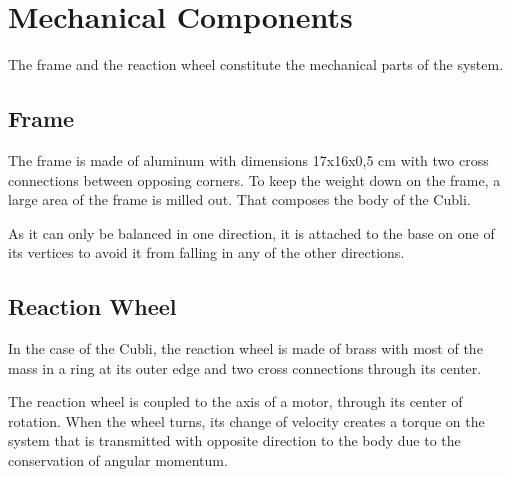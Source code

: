 \section{Mechanical Components}
The frame and the reaction wheel constitute the mechanical parts of the system.

\subsection{Frame}
The frame is made of aluminum with dimensions 17x16x0,5 \si{cm}  with two cross connections between opposing corners. To keep the weight down on the frame, a large area of the frame is milled out. That composes the body of the Cubli. 

As it can only be balanced in one direction, it is attached to the base on one of its vertices to avoid it from falling in any of the other directions.


\subsection{Reaction Wheel}
In the case of the Cubli, the reaction wheel is made of brass with most of the mass in a ring at its outer edge and two cross connections through its center.

The reaction wheel is coupled to the axis of a motor, through its center of rotation. When the wheel turns, its change of velocity creates a torque on the system that is transmitted with opposite direction to the body due to the conservation of angular momentum.
